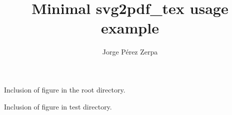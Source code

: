 \documentclass[]{article}
\title{Minimal svg2pdf\_tex usage example}
\author{Jorge Pérez Zerpa}
\begin{document}
\maketitle

Inclusion of figure in the root directory.
\begin{center}
	\def\svgwidth{0.6\textwidth}
	
\end{center}

Inclusion of figure in test directory.
\begin{center}
  \def\svgwidth{0.6\textwidth}
  
\end{center}
\end{document}
